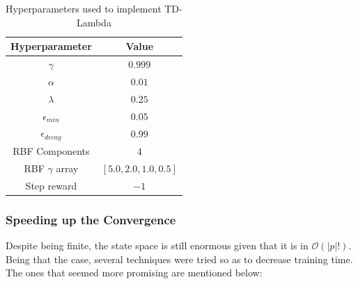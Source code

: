 \documentclass[11pt,twoside]{article}
\begin{document}
\begin{table}[H]
	\begin{center}
		\begin{tabular}{|c |c|} 
			\hline
			Hyperparameter & Value \\
			\hline\hline
			$\gamma$ & $0.999$ \\
			$\alpha$ & $0.01$ \\
			$\lambda$ & $0.25$ \\
			$\epsilon_{min}$ & $0.05$ \\
			$\epsilon_{decay}$ & $0.99$ \\
			RBF Components & $4$ \\
			RBF $\gamma$ array & $[5.0, 2.0, 1.0, 0.5]$ \\
			Step reward & $-1$ \\
			\hline
		\end{tabular}
		\caption{Hyperparameters used to implement TD-Lambda}
	\end{center}
\end{table}

\subsubsection{Speeding up the Convergence}

Despite being finite, the state space is still enormous given that it is in $\mathcal{O}(|p|!)$. Being that the case, several techniques were tried so as to decrease training time. The ones that seemed more promising are mentioned below:
\end{document}
